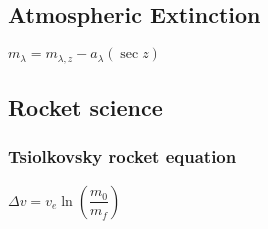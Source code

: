\subsection{Atmospheric Extinction}
\begin{itemize}
\itemt \( m_{\lambda} = m_{\lambda,z} - a_\lambda (\sec z) \)
\end{itemize}


\subsection{Rocket science}

\subsubsection{Tsiolkovsky rocket equation}
\begin{itemize}
\itemt \( \Delta v = v_e \ln\left(\dfrac{m_0}{m_f}\right) \)
\end{itemize}